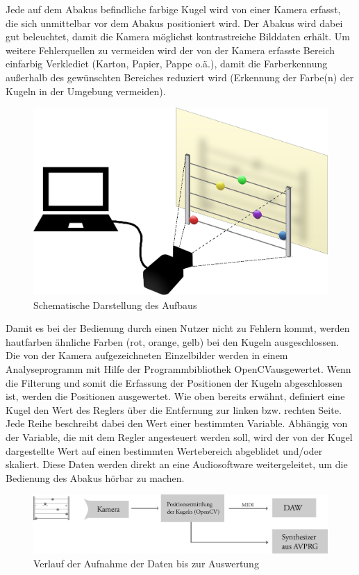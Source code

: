\documentclass[12pt]{article}
\begin{document}
Jede auf dem Abakus befindliche farbige Kugel wird von einer Kamera erfasst, die sich unmittelbar vor dem Abakus positioniert wird. Der Abakus wird dabei gut beleuchtet, damit die Kamera möglichst kontrastreiche Bilddaten erhält. Um weitere Fehlerquellen zu vermeiden wird der von der Kamera erfasste Bereich einfarbig Verklediet (Karton, Papier, Pappe o.ä.), damit die Farberkennung außerhalb des gewünschten Bereiches reduziert wird (Erkennung der Farbe(n) der Kugeln in der Umgebung vermeiden).
\begin{figure}[H]
\begin{center}
\includegraphics[width=0.6\linewidth]{Ges_Perspektive.png}
\caption{Schematische Darstellung des Aufbaus}
\end{center}
\end{figure}
Damit es bei der Bedienung durch einen Nutzer nicht zu Fehlern kommt, werden hautfarben ähnliche Farben (rot, orange, gelb) bei den Kugeln ausgeschlossen. Die von der Kamera aufgezeichneten Einzelbilder werden in einem Analyseprogramm mit Hilfe der Programmbibliothek \glqq OpenCV\grqq ausgewertet. Wenn die Filterung und somit die Erfassung der Positionen der Kugeln abgeschlossen ist, werden die Positionen ausgewertet. Wie oben bereits erwähnt, definiert eine Kugel den Wert des Reglers über die Entfernung zur linken bzw. rechten Seite. Jede Reihe beschreibt dabei den Wert einer bestimmten Variable. Abhängig von der Variable, die mit dem Regler angesteuert werden soll, wird der von der Kugel dargestellte Wert auf einen bestimmten Wertebereich abgeblidet und/oder skaliert. Diese Daten werden direkt an eine Audiosoftware weitergeleitet, um die Bedienung des Abakus hörbar zu machen.
 \begin{figure}[H]
\begin{center}
\includegraphics[width=0.8\linewidth]{Gruppe_6.png}
\caption{Verlauf der Aufnahme der Daten bis zur Auswertung}
\end{center}
\end{figure}
\end{document}
